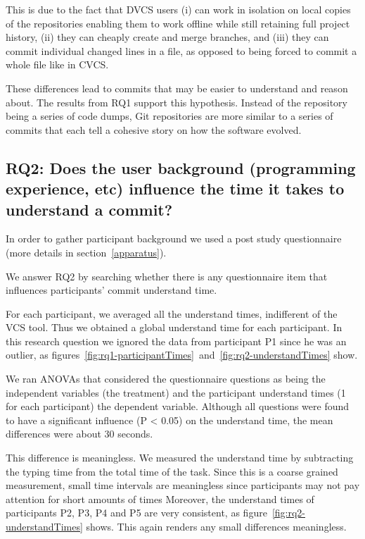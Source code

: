 \documentclass[letterpaper]{article}
\begin{document}
This is due to the fact that DVCS users (i) can work in isolation on local copies of the repositories enabling them to work offline while still retaining full project history, (ii) they can cheaply create and merge branches, and (iii) they can commit individual changed lines in a file, as opposed to being forced to commit a whole file like in CVCS.

These differences lead to commits that may be easier to understand and reason about.
The results from RQ1 support this hypothesis.
Instead of the repository being a series of code dumps, Git repositories are more similar to a series of commits that each tell a cohesive story on how the software evolved.

\subsection{RQ2: Does the user background (programming experience, etc) influence the time it takes to understand a commit?}

In order to gather participant background we used a post study questionnaire (more details in section~\ref{apparatus}).

We answer RQ2 by searching whether there is any questionnaire item that influences participants' commit understand time.

For each participant, we averaged all the understand times, indifferent of the VCS tool.
Thus we obtained a global understand time for each participant.
In this research question we ignored the data from participant P1 since he was an outlier, as figures~\ref{fig:rq1-participantTimes}~and~\ref{fig:rq2-understandTimes} show.

We ran ANOVAs that considered the questionnaire questions as being the independent variables (the treatment) and the participant understand times (1 for each participant) the dependent variable.
Although all questions were found to have a significant influence (P \textless{} 0.05) on the understand time, the mean differences were about 30 seconds.

This difference is meaningless.
We measured the understand time by subtracting the typing time from the total time of the task.
Since this is a coarse grained measurement, small time intervals are meaningless since participants may not pay attention for short amounts of times
Moreover, the understand times of participants P2, P3, P4 and P5 are very consistent, as figure~\ref{fig:rq2-understandTimes} shows. 
This again renders any small differences meaningless.
\end{document}
